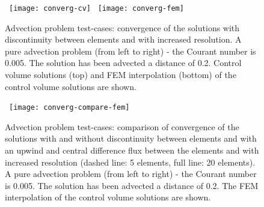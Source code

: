 \begin{figure}[h]
\vbox{\vspace{-2cm}
\hbox{\hspace{-.5cm}
\texttt{[image: converg-cv]}}
\vspace{-.5cm}
\hbox{\hspace{-.5cm}
\texttt{[image: converg-fem]}}
}\vspace{-.3cm}
\caption{Advection problem test-cases: convergence of the solutions
  with discontinuity between elements and with increased resolution. A
  pure advection problem (from left to right) - the Courant number is
  0.005. The solution has been advected a distance of 0.2. Control
  volume solutions (top) and FEM interpolation (bottom) of the control
  volume solutions are shown. \label{converg}}
\end{figure}


\begin{figure}[h]
\hbox{\hspace{-1cm}
\texttt{[image: converg-compare-fem]}}
\caption{Advection problem test-cases: comparison of convergence of
  the solutions with and without discontinuity between elements and
  with an upwind and central difference flux between the elements and
  with increased resolution (dashed line: 5 elements, full line: 20
  elements). A pure advection problem (from left to right) - the
  Courant number is 0.005. The solution has been advected a distance
  of 0.2. The FEM interpolation of the control volume solutions are
  shown. \label{converg-compare-fem}}
\end{figure}

